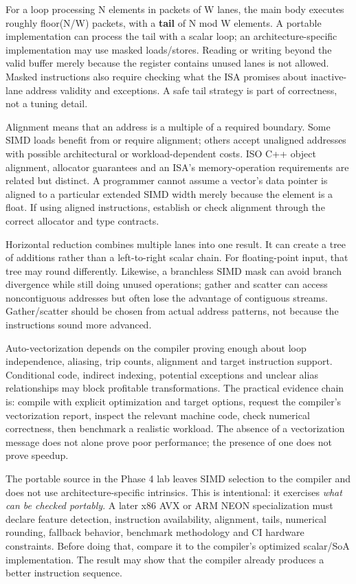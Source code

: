 For a loop processing N elements in packets of W lanes, the main body executes roughly floor(N/W) packets, with a \textbf{tail} of N mod W elements. A portable implementation can process the tail with a scalar loop; an architecture-specific implementation may use masked loads/stores. Reading or writing beyond the valid buffer merely because the register contains unused lanes is not allowed. Masked instructions also require checking what the ISA promises about inactive-lane address validity and exceptions. A safe tail strategy is part of correctness, not a tuning detail.

Alignment means that an address is a multiple of a required boundary. Some SIMD loads benefit from or require alignment; others accept unaligned addresses with possible architectural or workload-dependent costs. ISO C++ object alignment, allocator guarantees and an ISA's memory-operation requirements are related but distinct. A programmer cannot assume a vector's data pointer is aligned to a particular extended SIMD width merely because the element is a float. If using aligned instructions, establish or check alignment through the correct allocator and type contracts.

Horizontal reduction combines multiple lanes into one result. It can create a tree of additions rather than a left-to-right scalar chain. For floating-point input, that tree may round differently. Likewise, a branchless SIMD mask can avoid branch divergence while still doing unused operations; gather and scatter can access noncontiguous addresses but often lose the advantage of contiguous streams. Gather/scatter should be chosen from actual address patterns, not because the instructions sound more advanced.

Auto-vectorization depends on the compiler proving enough about loop independence, aliasing, trip counts, alignment and target instruction support. Conditional code, indirect indexing, potential exceptions and unclear alias relationships may block profitable transformations. The practical evidence chain is: compile with explicit optimization and target options, request the compiler's vectorization report, inspect the relevant machine code, check numerical correctness, then benchmark a realistic workload. The absence of a vectorization message does not alone prove poor performance; the presence of one does not prove speedup.

The portable source in the Phase 4 lab leaves SIMD selection to the compiler and does not use architecture-specific intrinsics. This is intentional: it exercises \emph{what can be checked portably}. A later x86 AVX or ARM NEON specialization must declare feature detection, instruction availability, alignment, tails, numerical rounding, fallback behavior, benchmark methodology and CI hardware constraints. Before doing that, compare it to the compiler's optimized scalar/SoA implementation. The result may show that the compiler already produces a better instruction sequence.

